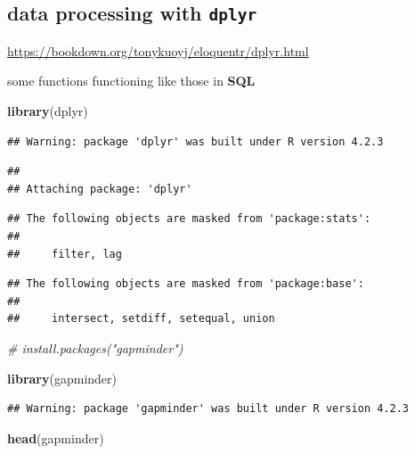 \documentclass[
]{book}
\newenvironment{Shaded}{\begin{snugshade}}{\end{snugshade}}
\newcommand{\CommentTok}[1]{\textcolor[rgb]{0.56,0.35,0.01}{\textit{#1}}}
\newcommand{\FunctionTok}[1]{\textcolor[rgb]{0.13,0.29,0.53}{\textbf{#1}}}
\newcommand{\NormalTok}[1]{#1}
\theoremstyle{definition}
\theoremstyle{definition}
\theoremstyle{definition}
\theoremstyle{definition}
\theoremstyle{remark}
\begin{document}
\subsection{\texorpdfstring{data processing with \texttt{dplyr}}{data processing with dplyr}}\label{data-processing-with-dplyr}

\url{https://bookdown.org/tonykuoyj/eloquentr/dplyr.html}

some functions functioning like those in \textbf{SQL}

\begin{Shaded}
\begin{Highlighting}[]
\FunctionTok{library}\NormalTok{(dplyr)}
\end{Highlighting}
\end{Shaded}

\begin{verbatim}
## Warning: package 'dplyr' was built under R version 4.2.3
\end{verbatim}

\begin{verbatim}
## 
## Attaching package: 'dplyr'
\end{verbatim}

\begin{verbatim}
## The following objects are masked from 'package:stats':
## 
##     filter, lag
\end{verbatim}

\begin{verbatim}
## The following objects are masked from 'package:base':
## 
##     intersect, setdiff, setequal, union
\end{verbatim}

\begin{Shaded}
\begin{Highlighting}[]
\CommentTok{\# install.packages("gapminder")}

\FunctionTok{library}\NormalTok{(gapminder)}
\end{Highlighting}
\end{Shaded}

\begin{verbatim}
## Warning: package 'gapminder' was built under R version 4.2.3
\end{verbatim}

\begin{Shaded}
\begin{Highlighting}[]
\FunctionTok{head}\NormalTok{(gapminder)}
\end{Highlighting}
\end{Shaded}
\end{document}
